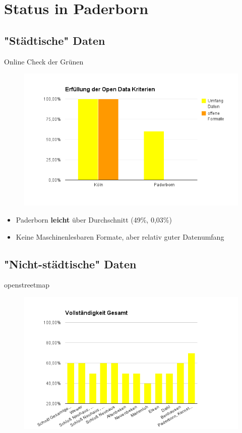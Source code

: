 \section{Status in Paderborn}

\subsection{"Städtische" Daten}
\begin{frame}[t]{Online Check der Grünen}
 \begin{figure}
  \centering
  \includegraphics[scale=0.45]{section_paderborn_status.png}
 \end{figure}
 \begin{itemize}
  \item Paderborn \textbf{leicht} über Durchschnitt (49\%, 0,03\%)
  \item Keine Maschinenlesbaren Formate, aber relativ guter Datenumfang
 \end{itemize}
\end{frame}

\subsection{"Nicht-städtische" Daten}

\begin{frame}[t]{openstreetmap}
 \begin{figure}
  \centering
  \includegraphics[scale=0.5]{section_paderborn_osm_overall.png}
 \end{figure}
\end{frame}


